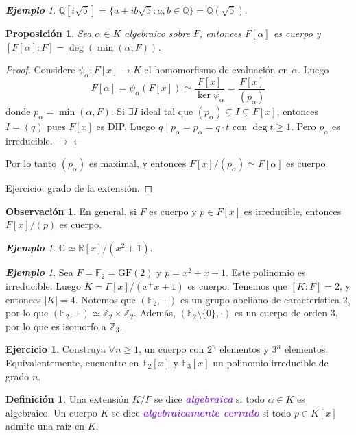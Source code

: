 \documentclass{article}
\newtheorem{proposition}[theorem]{Proposición}
\theoremstyle{definition}
\newtheorem{definition}[theorem]{Definición}
\newtheorem{exercise}{Ejercicio}
\newtheorem*{obs}{Observación}
\theoremstyle{remark}
\newtheorem{example}[theorem]{\textbf{Ejemplo}}
\numberwithin{equation}{section}
\newcommand{\C}{\mathbb{C}}
\newcommand{\F}{\mathbb{F}}
\newcommand{\Q}{\mathbb{Q}}
\newcommand{\R}{\mathbb{R}}
\newcommand{\Z}{\mathbb{Z}}
\renewcommand{\a}{\alpha}
\newcommand{\abs}[1]{\left| #1 \right|}
\newcommand{\wea}[1]{\textcolor{BlueViolet}{\textbf{\emph{#1}}}}
\begin{document}
\begin{example}
  $\Q[i\sqrt{5}] = \{a + ib \sqrt{5} : a,b \in \Q\} = \Q(\sqrt{5})$.
\end{example}

\begin{proposition}
  Sea $\a \in K$ algebraico sobre $F$, entonces $F[\a]$ es cuerpo y $[F[\a] : F] = \deg(\min(\a,F))$.
\end{proposition}
\begin{proof}
  Considere $\psi_\a \colon F[x] \to K$ el homomorfismo de evaluación en $\a$. Luego
  \[ F[\a] = \psi_\a(F[x]) \simeq \frac{F[x]}{\ker\psi_\a} = \frac{F[x]}{(p_\a)} \]
  donde $p_\a = \min(\a,F)$.
  Si $\exists I$ ideal tal que $(p_\a) \subsetneq I \subsetneq F[x]$, entonces $I = (q)$ pues $F[x]$ es DIP. Luego $q \mid p_\a = p_\a = q \cdot t$ con $\deg t \geq 1$. Pero $p_\a$ es irreducible. \(\to\gets\)

  Por lo tanto $(p_\a)$ es maximal, y entonces $F[x]/(p_\a) \simeq F[\a]$ es cuerpo.

  Ejercicio: grado de la extensión.
\end{proof}

\begin{obs}
  En general, si $F$ es cuerpo y $p \in F[x]$ es irreducible, entonces $F[x]/(p)$ es cuerpo.
\end{obs}

\begin{example}
  $\C \simeq \R[x]/(x^2+1)$.
\end{example}

\begin{example}
  Sea $F = \F_2 = \mathrm{GF}(2)$ y $p = x^2 + x + 1$. Este polinomio es irreducible. Luego $K = F[x]/(x^+ x + 1)$ es cuerpo. Tenemos que $[K:F] = 2$, y entonces $\abs K = 4$. Notemos que $(\F_2,+)$ es un grupo abeliano de característica 2, por lo que $(\F_2,+) \simeq \Z_2 \times \Z_2$. Además, $(\F_2 \setminus \{0\},\cdot)$ es un cuerpo de orden 3, por lo que es isomorfo a $\Z_3$.
\end{example}

\begin{exercise}
  Construya $\forall n \geq 1$, un cuerpo con $2^n$ elementos y $3^n$ elementos. Equivalentemente, encuentre en $\F_2[x]$ y $\F_3[x]$ un polinomio irreducible de grado $n$.
\end{exercise}

\begin{definition}
  Una extensión $K/F$ se dice \wea{algebraica} si todo $\a \in K$ es algebraico.
  Un cuerpo $K$ se dice \wea{algebraicamente cerrado} si todo $p \in K[x]$ admite una raíz en $K$.
\end{definition}
\end{document}
